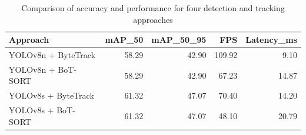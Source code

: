 \begin{table}
\caption{Comparison of accuracy and performance for four detection and tracking approaches}
\label{tab:models_comparison}
\begin{tabular}{lrrrr}
\toprule
Approach & mAP_50 & mAP_50_95 & FPS & Latency_ms \\
\midrule
YOLOv8n + ByteTrack & 58.29 & 42.90 & 109.92 & 9.10 \\
YOLOv8n + BoT-SORT & 58.29 & 42.90 & 67.23 & 14.87 \\
YOLOv8s + ByteTrack & 61.32 & 47.07 & 70.40 & 14.20 \\
YOLOv8s + BoT-SORT & 61.32 & 47.07 & 48.10 & 20.79 \\
\bottomrule
\end{tabular}
\end{table}
